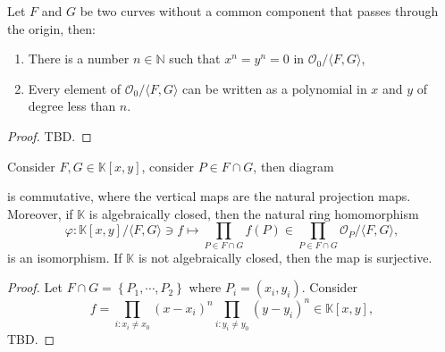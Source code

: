 \documentclass[10pt]{article}
\begin{document}
\begin{lemma}\label{lemma:finite_intersection}
  Let $F$ and $G$ be two curves without a common component that passes through the origin, then:
  \begin{enumerate}[(1)]
    \item There is a number $n \in \mathbb{N}$ such that $x^n = y^n = 0$ in $\mathcal{O}_0/\langle F,G\rangle$,
    \item Every element of $\mathcal{O}_0/\langle F,G\rangle$ can be written as a polynomial in $x$ and $y$ of degree less than $n$.
  \end{enumerate}
\end{lemma}
\begin{proof}
  TBD.
\end{proof}

\begin{lemma}
  Consider $ F, G \in \mathbb{K}[x,y]$, consider $ P \in F \cap G$, then diagram
  \begin{center}
  \end{center}
  is commutative, where the vertical maps are the natural projection maps. Moreover, if $ \mathbb{K}$ is algebraically closed, then the natural ring homomorphism
  \begin{equation*}
    \varphi : \mathbb{K}[x,y]/\langle F,G \rangle \ni f \mapsto \prod_{P \in F \cap G} f(P) \in \prod_{P \in F \cap G} \mathcal{O}_P/\langle F,G \rangle,
  \end{equation*}
  is an isomorphism. If $ \mathbb{K}$ is not algebraically closed, then the map is surjective.
\end{lemma}
\begin{proof}
  Let $ F \cap G = \left\{ P_1, \cdots ,P_2 \right\}$ where $ P_{i} = (x_{i}, y_{i})$. Consider
  \begin{equation*}
    f = \prod_{i: x_{i} \neq x_{0}} \left( x-x_{i} \right)^{n} \prod_{i:y_{i} \neq y_0} \left( y - y_{i} \right)^{n}\in \mathbb{K}[x,y],
  \end{equation*}
  TBD.
\end{proof}
\end{document}

